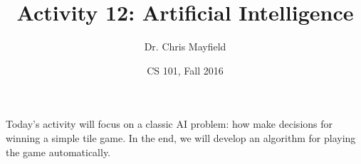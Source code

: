 \documentclass[12pt]{article}
\title{Activity 12: Artificial Intelligence}
\author{Dr. Chris Mayfield}
\date{CS 101, Fall 2016}
\begin{document}
\maketitle

Today's activity will focus on a classic AI problem: how make decisions for winning a simple tile game.
In the end, we will develop an algorithm for playing the game automatically.



\end{document}
